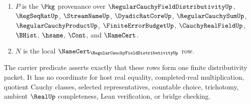 \begin{definition}
\begin{enumerate}
\item $P$ is the $\Pkg$ provenance over $\RegularCauchyFieldDistributivityUp$, $\RegSeqRatUp$, $\StreamNameUp$, $\DyadicRatCoreUp$, $\RegularCauchySumUp$, $\RegularCauchyProductUp$, $\FiniteErrorBudgetUp$, $\CauchyRealFieldUp$, $\BHist$, $\hsame$, $\Cont$, and $\NameCert$.
\item $N$ is the local $\NameCert_{\RegularCauchyFieldDistributivityUp}$ row.
\end{enumerate}
The carrier predicate asserts exactly that these rows form one finite distributivity packet. It has no coordinate for host real equality, completed-real multiplication, quotient Cauchy classes, selected representatives, countable choice, trichotomy, ambient $\RealUp$ completeness, Lean verification, or bridge checking.
\end{definition}

